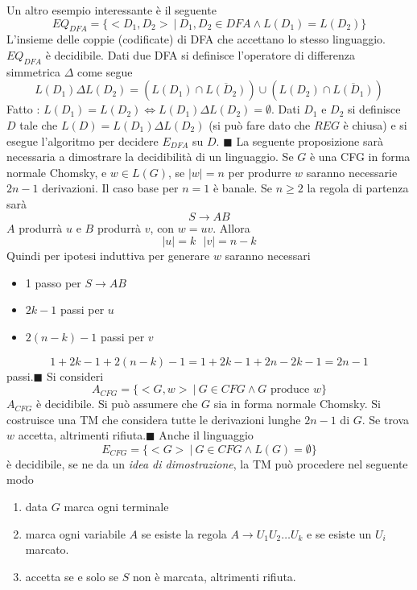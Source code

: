 \documentclass[10pt, letterpaper]{report}
\begin{document}
Un altro esempio interessante è il seguente 
$$ EQ_{DFA}=\{<D_1,D_2>\ | \ D_1,D_2\in DFA\land L(D_1)=L(D_2)\}$$
L'insieme delle coppie (codificate) di DFA che accettano lo stesso linguaggio.\acc 
\prop{} $EQ_{DFA}$ è decidibile. \acc 
\dimo{} Dati due DFA si definisce l'operatore di  differenza simmetrica $\Delta$ come segue 
$$ L(D_1)\Delta L(D_2)= (L(D_1)\cap \overline{L(D_2)})\cup (L(D_2)\cap \overline{L(D_1)})$$
Fatto : $L(D_1)=L(D_2)\iff L(D_1)\Delta L(D_2)=\emptyset$. Dati $D_1$ e $D_2$ si definisce $D$ tale che 
$L(D)=L(D_1)\Delta L(D_2)$ (si può fare dato che $REG$ è chiusa) e si esegue l'algoritmo per decidere $E_{DFA}$ su $D$. \hfill$\blacksquare$\acc 
La seguente proposizione sarà necessaria a dimostrare la decidibilità di un linguaggio. \acc 
\prop{} Se $G$ è una CFG in forma normale Chomsky, e $w\in L(G)$, se $|w|=n$ per produrre $w$ saranno necessarie $2n-1$ derivazioni. \acc 
\dimo{} Il caso base per $n=1$ è banale. Se $n\ge 2$ la regola di partenza sarà $$ S\rightarrow AB$$ 
$A$ produrrà $u$ e $B$ produrrà $v$, con $w=uv$. Allora 
$$ |u|= k \ \ \ |v|=n-k$$
Quindi per ipotesi induttiva per generare $w$ saranno necessari \begin{itemize}
    \item 1 passo per $S\rightarrow AB$
    \item $2k-1$ passi per $u$
    \item $2(n-k)-1$ passi per $v$
\end{itemize}
$$ 1+2k-1+2(n-k)-1=1+2k-1+2n-2k-1=2n-1$$
passi.\hfill$\blacksquare$\acc 
Si consideri 
$$ A_{CFG}=\{<G,w>\ |\ G\in CFG \land G \text{ produce }w\}$$
\prop{} $A_{CFG}$ è decidibile. \acc 
\dimo{} Si può assumere che $G$ sia in forma normale Chomsky. Si costruisce una TM che considera tutte le derivazioni lunghe $2n-1$ di $G$. Se trova $w$ accetta, altrimenti rifiuta.\hfill$\blacksquare$\acc 
Anche il linguaggio 
$$ E_{CFG}=\{<G>\ | \ G\in CFG \land L(G)=\emptyset\}$$
è decidibile, se ne da un \textit{idea di dimostrazione}, la TM può procedere nel seguente modo\begin{enumerate}
    \item data $G$ marca ogni terminale 
    \item marca ogni variabile $A$ se esiste la regola $A\longrightarrow U_1U_2\dots U_k$
    e se esiste un $U_i$ marcato. 
    \item accetta se e solo se $S$ non è marcata, altrimenti rifiuta.
\end{enumerate}
\flowerLine 
\end{document}
